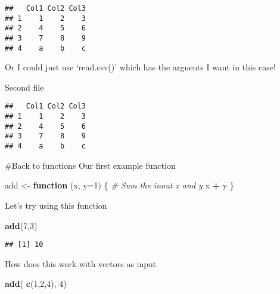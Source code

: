 \documentclass[
]{article}
\newenvironment{Shaded}{\begin{snugshade}}{\end{snugshade}}
\newcommand{\CommentTok}[1]{\textcolor[rgb]{0.56,0.35,0.01}{\textit{#1}}}
\newcommand{\ControlFlowTok}[1]{\textcolor[rgb]{0.13,0.29,0.53}{\textbf{#1}}}
\newcommand{\DataTypeTok}[1]{\textcolor[rgb]{0.13,0.29,0.53}{#1}}
\newcommand{\DecValTok}[1]{\textcolor[rgb]{0.00,0.00,0.81}{#1}}
\newcommand{\KeywordTok}[1]{\textcolor[rgb]{0.13,0.29,0.53}{\textbf{#1}}}
\newcommand{\NormalTok}[1]{#1}
\newcommand{\OperatorTok}[1]{\textcolor[rgb]{0.81,0.36,0.00}{\textbf{#1}}}
\newcommand{\OtherTok}[1]{\textcolor[rgb]{0.56,0.35,0.01}{#1}}
\newcommand{\StringTok}[1]{\textcolor[rgb]{0.31,0.60,0.02}{#1}}
\begin{document}
\begin{verbatim}
##   Col1 Col2 Col3
## 1    1    2    3
## 2    4    5    6
## 3    7    8    9
## 4    a    b    c
\end{verbatim}

Or I could just use `read.csv()' which has the arguents I want in this
case!

Second file

\begin{Shaded}
\end{Shaded}

\begin{verbatim}
##   Col1 Col2 Col3
## 1    1    2    3
## 2    4    5    6
## 3    7    8    9
## 4    a    b    c
\end{verbatim}

\#Back to functions Our first example function

\begin{Shaded}
\begin{Highlighting}[]
\NormalTok{add <-}\StringTok{ }\ControlFlowTok{function}\NormalTok{ (x, }\DataTypeTok{y=}\DecValTok{1}\NormalTok{) \{ }
  \CommentTok{# Sum the inout x and y}
\NormalTok{  x }\OperatorTok{+}\StringTok{ }\NormalTok{y}
\NormalTok{\}}
\end{Highlighting}
\end{Shaded}

Let's try using this function

\begin{Shaded}
\begin{Highlighting}[]
\KeywordTok{add}\NormalTok{(}\DecValTok{7}\NormalTok{,}\DecValTok{3}\NormalTok{)}
\end{Highlighting}
\end{Shaded}

\begin{verbatim}
## [1] 10
\end{verbatim}

How does this work with vectors as input

\begin{Shaded}
\begin{Highlighting}[]
\KeywordTok{add}\NormalTok{( }\KeywordTok{c}\NormalTok{(}\DecValTok{1}\NormalTok{,}\DecValTok{2}\NormalTok{,}\DecValTok{4}\NormalTok{), }\DecValTok{4}\NormalTok{)}
\end{Highlighting}
\end{Shaded}
\end{document}
